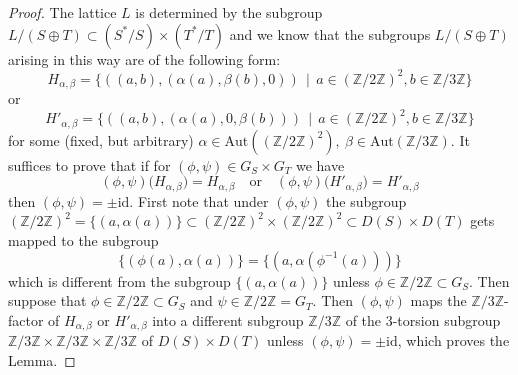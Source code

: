 \documentclass[11pt]{amsart}
\theoremstyle{plain}
\numberwithin{equation}{section}
\theoremstyle{definition}
\theoremstyle{remark}
\begin{document}
\begin{proof}
The lattice $L$ is determined by the subgroup $L /(S \oplus T) \subset (S^*/S) \times (T^*/T)$ and we know that the subgroups $L/(S\oplus T)$ arising in this way are of the following form:
\[
H_{\alpha, \beta} = \bigl\{  ((a, b), (\alpha (a)  , \beta (b) , 0)) \, \mid \, a \in ( \mathbb{Z}/2\mathbb{Z})^2, b \in   \mathbb{Z}/3\mathbb{Z} \bigr\}
\]
or 
\[
H'_{\alpha, \beta} = \bigl\{  ((a, b), (\alpha (a)  , 0 , \beta (b))) \, \mid \, a \in ( \mathbb{Z}/2\mathbb{Z})^2, b \in   \mathbb{Z}/3\mathbb{Z} \bigr\}
\]
for some (fixed, but arbitrary) $\alpha \in \mathrm{Aut}((\mathbb{Z}/2\mathbb{Z})^2), \: \beta \in \mathrm{Aut}(\mathbb{Z}/3\mathbb{Z})$. It suffices to prove that if for $(\phi, \psi) \in G_S \times G_T$ we have 
\[
(\phi, \psi) \bigl( H_{\alpha, \beta} \bigr) = H_{\alpha, \beta} \quad \mathrm{or} \quad (\phi, \psi) \bigl( H'_{\alpha, \beta} \bigr) = H'_{\alpha, \beta}  
\]
then $(\phi, \psi) = \pm \mathrm{id}$. First note that under $(\phi, \psi)$ the subgroup $( \mathbb{Z}/2\mathbb{Z})^2 = \{ (a, \alpha (a)) \} \subset ( \mathbb{Z}/2\mathbb{Z})^2 \times ( \mathbb{Z}/2\mathbb{Z})^2 \subset D(S) \times D(T)$ gets mapped to the subgroup 
\[
\{ (\phi (a), \alpha (a)) \} = \{ (a, \alpha ( \phi^{-1} (a))) \}
\]
which is different from the subgroup $\{ (a, \alpha (a)) \}$ unless $\phi \in \mathbb{Z}/2\mathbb{Z} \subset G_S$. Then suppose that $\phi \in \mathbb{Z}/2\mathbb{Z} \subset G_S$ and $\psi \in \mathbb{Z}/2\mathbb{Z} = G_T$. 
Then $(\phi, \psi )$ maps the $\mathbb{Z}/3\mathbb{Z}$-factor of $H_{\alpha, \beta}$ or $H'_{\alpha, \beta}$ into a different subgroup $\mathbb{Z}/3\mathbb{Z}$ of the $3$-torsion subgroup $\mathbb{Z}/3\mathbb{Z} \times \mathbb{Z}/3\mathbb{Z} \times \mathbb{Z}/3\mathbb{Z} $ of $D(S) \times D(T)$ unless $(\phi, \psi) = \pm \mathrm{id}$, which proves the Lemma. 
\end{proof}
 
\end{document}
